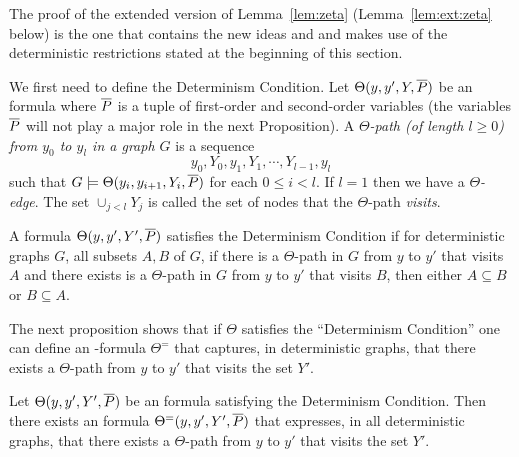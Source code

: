The proof of the extended version of Lemma~\ref{lem:zeta} (Lemma~\ref{lem:ext:zeta} below)
is the one that contains the new ideas and and makes use of the deterministic restrictions stated at the beginning of this section.

We first need to define the Determinism Condition. Let $\Theta(y,y',Y,\overline{P})$ be an \msol formula where $\overline{P}$ is a tuple of first-order and second-order variables (the variables $\overline{P}$ will not play a major role in the next Proposition). A \emph{$\Theta$-path (of length $l \geq 0$) from $y_0$ to $y_l$ in a graph $G$} is a
sequence 
\[
y_0, Y_0 ,y_1, Y_1, \cdots, Y_{l-1}, y_l
\]
such that $G \models \Theta(y_i,y_{i+1},Y_i,\overline{P})$ for each $0 \leq i < l$. If $l= 1$ then we have a \emph{$\Theta$-edge}.
The set $\cup_{j < l} Y_j$ is called the set of nodes that the $\Theta$-path \emph{visits}.



\begin{definition} \label{def:DC}
A formula $\Theta(y,y',Y',\overline{P})$ satisfies the Determinism Condition if for deterministic graphs $G$, 
all subsets $A,B$ of $G$, if there is a $\Theta$-path in $G$ from $y$ to $y'$ that visits $A$ and there exists is a $\Theta$-path in $G$ from $y$ to $y'$ that visits $B$, then either $A \subseteq B$ or $B \subseteq A$.
\end{definition}

The next proposition shows that if $\Theta$ satisfies the ``Determinism Condition''
one can define an \msol-formula $\Theta^=$ that captures, in deterministic graphs, that there exists a $\Theta$-path from $y$ to $y'$ that visits the set $Y'$.


\begin{proposition} \label{prop:ext:TC}
Let $\Theta(y,y',Y',\overline{P})$ be an \msol formula satisfying the Determinism Condition.
Then there exists an \msol formula $\Theta^{=}(y,y',Y',\overline{P})$ that expresses, in all deterministic graphs, 
that there exists a $\Theta$-path from $y$ to $y'$ that visits the set $Y'$.
\end{proposition}

